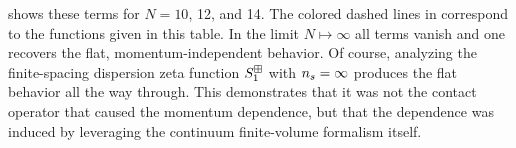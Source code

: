  shows these terms for $N=10$, 12, and 14.
The colored dashed lines in  correspond to the functions given in this table.  In the limit $N\mapsto\infty$ all terms vanish and one recovers the flat, momentum-independent behavior.
Of course, analyzing the finite-spacing dispersion zeta function $S^{\boxplus}_1$ with ${n_s}=\infty$ produces the flat behavior all the way through.
This demonstrates that it was not the contact operator that caused the momentum dependence, but that the dependence was induced by leveraging the continuum finite-volume formalism itself.

